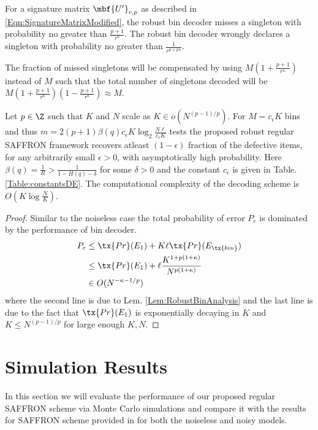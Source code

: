 \documentclass[conference,twocolumn]{IEEEtran}
\def\ceps{c_{\epsilon}}
\begin{document}
\begin{lemma}
\label{Lem:RobustBinAnalysis}
For a signature matrix $\mbf{U'}_{r,p}$ as described in \eqref{Eqn:SignatureMatrixModified}, the robust bin decoder misses a singleton with probability no greater than $\frac{p+1}{r^{\kappa}}$. The robust bin decoder wrongly declares a singleton with probability no greater than $\frac{1}{r^{p+p\kappa}}$.
\end{lemma}
The fraction of missed singletons will be compensated by using $M(1+\frac{p+1}{r^{\kappa}})$ instead of $M$ such that the total number of singletons decoded will be $M(1+\frac{p+1}{r^{\kappa}})(1-\frac{p+1}{r^{\kappa}})\approx M$.

\begin{theorem}
Let $p\in\Z$ such that $K$ and $N$ scale as $K\in o\left(N^{(p-1)/p}\right)$. For $M=\ceps K$ bins and thus $m=2(p+1)\beta(q)c_{\epsilon}K \log_{2}\frac{N\ell}{\ceps K}$ tests the proposed robust regular SAFFRON framework recovers atleast $(1-\epsilon)$ fraction of the defective items, for any arbitrarily small $\epsilon>0$, with asymptotically high probability.%
Here $\beta(q)=\frac{1}{R}>\frac{1}{1-H(q)-\delta}$ for some $\delta>0$ and the constant $c_{\epsilon}$ is given in Table. \ref{Table:constantsDE}. The computational complexity of the decoding scheme is $O(K\log \frac{N}{K})$.
\end{theorem}
\begin{proof}
Similar to the noiseless case the total probability of error $P_e$ is dominated by the performance of bin decoder. 
\begin{align*}
P_e &\leq  \tx{Pr}(E_1)+ K\ell\tx{Pr}(E_{\tx{bin}})\\
               &\leq \tx{Pr}(E_1)+ \ell \frac{K^{1+p(1+\kappa)}}{N^{p(1+\kappa)}}\\
               &\in O(N^{-\kappa-1/p})
\end{align*}
where the second line is due to Lem. \ref{Lem:RobustBinAnalysis} and the last line is due to the fact that $\tx{Pr}(E_1)$ is exponentially decaying in $K$ and $K\leq N^{(p-1)/p}$ for large enough $K,N$.
\end{proof}

\section{Simulation Results}
In this section we will evaluate the performance of our proposed regular SAFFRON scheme via Monte Carlo simulations and compare it with the results for SAFFRON scheme provided in \cite{lee2015saffron} for both the noiseless and noisy models.
\end{document}
